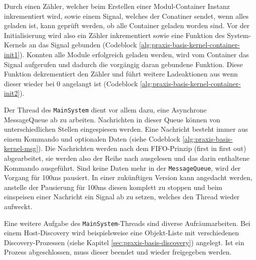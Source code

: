 Durch einen Z\"ahler, welcher beim Erstellen einer Modul-Container Instanz inkrementiert wird, sowie einem Signal, welches der Conatiner sendet, wenn alles geladen ist, kann gepr\"uft werden, ob alle Container geladen worden sind. Vor der Initialisierung wird also ein Z\"ahler inkrementiert sowie eine Funktion des System-Kernels an das Signal gebunden (Codeblock \ref{alg:praxis-basis-kernel-container-init1}). Konnten alle Module erfolgreich geladen werden, wird vom Container das Signal aufgerufen und dadurch die vorg\"angig daran gebundene Funktion. Diese Funktion dekrementiert den Z\"ahler und f\"uhrt weitere Ladeaktionen aus wenn dieser wieder bei $0$ angelangt ist (Codeblock \ref{alg:praxis-basis-kernel-container-init2}).

Der Thread des \texttt{MainSystem} dient vor allem dazu, eine Asynchrone MessageQueue ab zu arbeiten. Nachrichten in dieser Queue k\"onnen von unterschiedlichen Stellen eingespiesen werden. Eine Nachricht besteht immer aus einem Kommando und optionalen Daten (siehe Codeblock \ref{alg:praxis-basis-kernel-msg}). Die Nachrichten werden nach dem FIFO-Prinzip (first in first out) abgearbeitet, sie werden also der Reihe nach ausgelesen und das darin enthaltene Kommando ausgef\"uhrt. Sind keine Daten mehr in der \texttt{MessageQueue}, wird der Vorgang f\"ur 100ms pausiert. In einer zuk\"unftigen Version kann angedacht werden, anstelle der Pausierung f\"ur 100ms diesen komplett zu stoppen und beim einspeisen einer Nachricht ein Signal ab zu setzen, welches den Thread wieder aufweckt.

Eine weitere Aufgabe des \texttt{MainSystem}-Threads sind diverse Aufr\"aumarbeiten. Bei einem Host-Discovery wird beispielsweise eine Objekt-Liste mit verschiedenen Discovery-Prozessen (siehe Kapitel \ref{sec:praxis-basis-discovery}) angelegt. Ist ein Prozess abgeschlossen, muss dieser beendet und wieder freigegeben werden.

